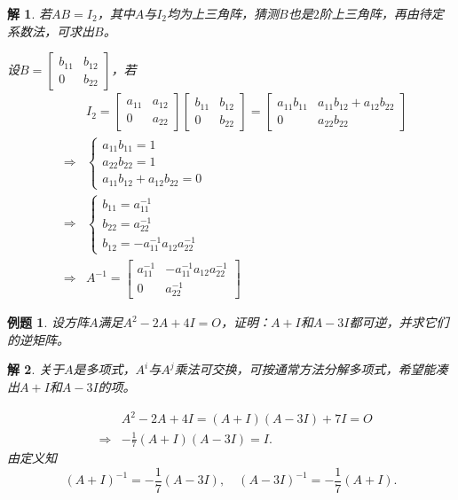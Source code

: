 \documentclass[a4paper]{book}
\newtheorem{eg}{例题}[chapter]
\newtheorem*{solution}{解}
\begin{document}
\begin{solution}
若$AB = I_2$，其中$A$与$I_2$均为上三角阵，猜测$B$也是$2$阶上三角阵，再由待定系数法，可求出$B$。

设$B = \begin{bmatrix} b_{11} & b_{12} \\ 0 & b_{22} \end{bmatrix}$，若
\begin{eqnarray*}
& & I_2 = \begin{bmatrix} a_{11} & a_{12} \\ 0 & a_{22} \end{bmatrix} \begin{bmatrix} b_{11} & b_{12} \\ 0 & b_{22} \end{bmatrix} = \begin{bmatrix} a_{11}b_{11} & a_{11}b_{12} + a_{12}b_{22} \\ 0 & a_{22}b_{22} \end{bmatrix} \\
& \Longrightarrow & \begin{cases} a_{11}b_{11} = 1 \\ a_{22}b_{22} = 1 \\ a_{11}b_{12} + a_{12}b_{22} = 0 \end{cases} \\
& \Longrightarrow & \begin{cases} b_{11} = a_{11}^{-1} \\ b_{22} = a_{22}^{-1} \\ b_{12} = -a_{11}^{-1}a_{12}a_{22}^{-1} \end{cases} \\
& \Longrightarrow & A^{-1} = \begin{bmatrix} a_{11}^{-1} & -a_{11}^{-1}a_{12}a_{22}^{-1} \\ 0 & a_{22}^{-1} \end{bmatrix}
\end{eqnarray*}
\end{solution}

\begin{eg}
设方阵$A$满足$A^2-2A+4I=O$，证明：$A+I$和$A-3I$都可逆，并求它们的逆矩阵。
\end{eg}

\begin{solution}
关于$A$是多项式，$A^i$与$A^j$乘法可交换，可按通常方法分解多项式，希望能凑出$A+I$和$A-3I$的项。

\begin{eqnarray*}
& & A^2-2A+4I = (A+I)(A-3I)+7I = O \\
& \Longrightarrow & -\frac17 (A+I)(A-3I) = I.
\end{eqnarray*}
由定义知
$$(A+I)^{-1} = -\frac17 (A-3I), \quad (A-3I)^{-1} = -\frac17 (A+I).$$
\end{solution}
\end{document}

